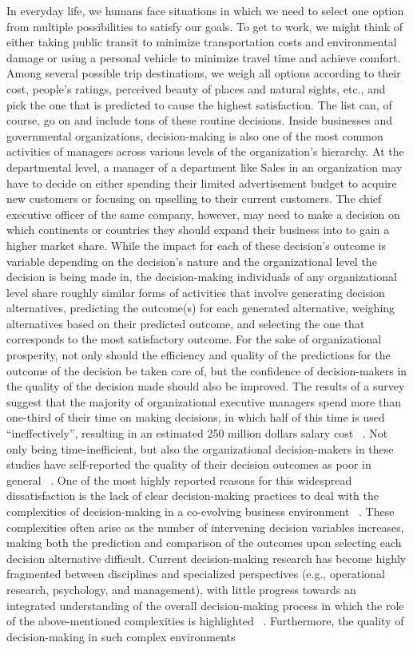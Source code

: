 \documentclass{sfuthesis}
\begin{document}
In everyday life, we humans face situations in which we need to select one option from multiple possibilities to satisfy our goals. To get to work, we might think of either taking public transit to minimize transportation costs and environmental damage or using a personal vehicle to minimize travel time and achieve comfort. Among several possible trip destinations, we weigh all options according to their cost, people’s ratings, perceived beauty of places and natural sights, etc., and pick the one that is predicted to cause the highest satisfaction. The list can, of course, go on and include tons of these routine decisions. Inside businesses and governmental organizations, decision-making is also one of the most common activities of managers across various levels of the organization’s hierarchy. At the departmental level, a manager of a department like Sales in an organization may have to decide on either spending their limited advertisement budget to acquire new customers or focusing on upselling to their current customers. The chief executive officer of the same company, however, may need to make a decision on which continents or countries they should expand their business into to gain a higher market share. While the impact for each of these decision’s outcome is variable depending on the decision’s nature and the organizational level the decision is being made in, the decision-making individuals of any organizational level share roughly similar forms of activities that involve generating decision alternatives, predicting the outcome(s) for each generated alternative, weighing alternatives based on their predicted outcome, and selecting the one that corresponds to the most satisfactory outcome. For the sake of organizational prosperity, not only should the efficiency and quality of the predictions for the outcome of the decision be taken care of, but the confidence of decision-makers in the quality of the decision made should also be improved. The results of a survey suggest that the majority of organizational executive managers spend more than one-third of their time on making decisions, in which half of this time is used “ineffectively”, resulting in an estimated 250 million dollars salary cost ~\cite{smet_three_nodate}. Not only being time-inefficient, but also the organizational decision-makers in these studies have self-reported the quality of their decision outcomes as poor in general ~\cite{smet_three_nodate}. One of the most highly reported reasons for this widespread dissatisfaction is the lack of clear decision-making practices to deal with the complexities of decision-making in a co-evolving business environment ~\cite{smet_three_nodate}. These complexities often arise as the number of intervening decision variables increases, making both the prediction and comparison of the outcomes upon selecting each decision alternative difficult. Current decision-making research has become highly fragmented between disciplines and specialized perspectives (e.g., operational research, psychology, and management), with little progress towards an integrated understanding of the overall decision-making process in which the role of the above-mentioned complexities is highlighted ~\cite{adinolfi2021journey}. Furthermore, the quality of decision-making in such complex environments 
\end{document}
